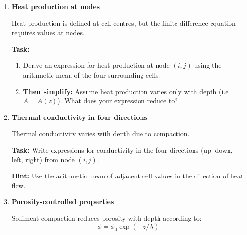 \documentclass[final,a4paper,12pt]{article}
\begin{document}
\begin{enumerate}
\textbf{Task:} Derive the finite difference equation for the temperature at node
$(i,j)$ using a central difference approximation.

\textbf{Important:}
\begin{itemize}
    \item Write the equation in terms of heat fluxes entering and leaving the node
    \item Use conductivities defined at the \textbf{interfaces} (up, down, left, right)
\end{itemize}

\textbf{Your answer should clearly show:}
\begin{itemize}
    \item contributions from all four neighboring nodes
    \item the role of heat production at the node
\end{itemize}

\bigskip

\item \textbf{Heat production at nodes}

Heat production is defined at cell centres, but the finite difference equation
requires values at nodes.

\textbf{Task:}
\begin{enumerate}
    \item Derive an expression for heat production at node $(i,j)$ using the
    arithmetic mean of the four surrounding cells.
    \item \textbf{Then simplify:} Assume heat production varies only with depth
    (i.e.\ $A = A(z)$). What does your expression reduce to?
\end{enumerate}

\bigskip

\item \textbf{Thermal conductivity in four directions}

Thermal conductivity varies with depth due to compaction.

\textbf{Task:} Write expressions for conductivity in the four directions
(up, down, left, right) from node $(i,j)$.

\textbf{Hint:} Use the arithmetic mean of adjacent cell values in the direction
of heat flow.

\bigskip

\item \textbf{Porosity-controlled properties}

Sediment compaction reduces porosity with depth according to:
\begin{equation}
\phi = \phi_0 \exp(-z/\lambda)
\end{equation}


\end{enumerate}
\end{document}
